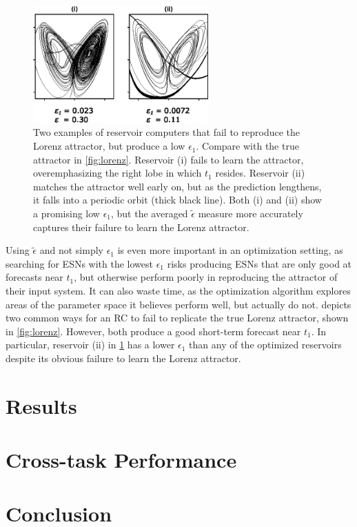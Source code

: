 \begin{figure}
  \includegraphics[width=0.6\textwidth]{figures/epsilon-failure}
  \caption{Two examples of reservoir computers that fail to reproduce
    the Lorenz attractor, but produce a low $\epsilon_1$. Compare with
    the true attractor in \cref{fig:lorenz}. Reservoir (i) fails to
    learn the attractor, overemphasizing the right lobe in which $t_1$
    resides. Reservoir (ii) matches the attractor well early on, but
    as the prediction lengthens, it falls into a periodic orbit (thick
    black line). Both (i) and (ii) show a promising low $\epsilon_1$,
    but the averaged $\tilde{\epsilon}$ measure more accurately
    captures their failure to learn the Lorenz attractor.}%
  \label{fig:epsilon-failure}
\end{figure}

Using $\tilde{\epsilon}$ and not simply $\epsilon_1$ is even more
important in an optimization setting, as searching for ESNs with the
lowest $\epsilon_1$ risks producing ESNs that are only good at
forecasts near $t_1$, but otherwise perform poorly in reproducing the
attractor of their input system. It can also waste time, as the
optimization algorithm explores areas of the parameter space it
believes perform well, but actually do not. 
depicts two common ways for an RC to fail to replicate the true Lorenz
attractor, shown in \cref{fig:lorenz}. However, both produce a good
short-term forecast near $t_1$. In particular, reservoir (ii) in
\cref{fig:epsilon-failure} has a lower $\epsilon_1$ than any of
the optimized reservoirs despite its obvious failure to learn the
Lorenz attractor.

\section{Results}

\section{Cross-task Performance}

\section{Conclusion}
